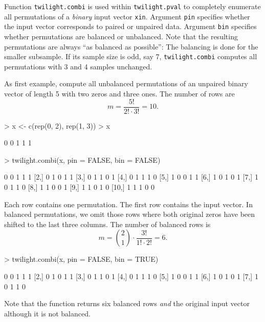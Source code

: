\documentclass[11pt,a4paper,fleqn]{report}
\newcommand{\Rfunction}[1]{{\texttt{#1}}}
\newcommand{\Rfunarg}[1]{{\texttt{#1}}}
\begin{document}
Function \Rfunction{twilight.combi} is used within \Rfunction{twilight.pval} to completely enumerate all permutations of a \textit{binary} input vector \Rfunarg{xin}. Argument \Rfunarg{pin} specifies whether the input vector corresponds to paired or unpaired data. Argument \Rfunarg{bin} specifies whether permutations are balanced or unbalanced. Note that the resulting permutations are always ``as balanced as possible'': The balancing is done for the smaller subsample. If its sample size is odd, say 7, \Rfunction{twilight.combi} computes all permutations with 3 and 4 samples unchanged.

As first example, compute all unbalanced permutations of an unpaired binary vector of length 5 with two zeros and three ones. The number of rows are 
\begin{equation}
m = \frac{5!}{2! \cdot 3!} = 10.
\end{equation}
\begin{Schunk}
\begin{Sinput}
> x <- c(rep(0, 2), rep(1, 3))
> x
\end{Sinput}
\begin{Soutput}
[1] 0 0 1 1 1
\end{Soutput}
\end{Schunk}

\begin{Schunk}
\begin{Sinput}
> twilight.combi(x, pin = FALSE, bin = FALSE)
\end{Sinput}
\begin{Soutput}
      [,1] [,2] [,3] [,4] [,5]
 [1,]    0    0    1    1    1
 [2,]    0    1    0    1    1
 [3,]    0    1    1    0    1
 [4,]    0    1    1    1    0
 [5,]    1    0    0    1    1
 [6,]    1    0    1    0    1
 [7,]    1    0    1    1    0
 [8,]    1    1    0    0    1
 [9,]    1    1    0    1    0
[10,]    1    1    1    0    0
\end{Soutput}
\end{Schunk}

Each row contains one permutation. The first row contains the input vector. In balanced permutations, we omit those rows where both original zeros have been shifted to the last three columns. The number of balanced rows is
\begin{equation}
m = {2 \choose 1} \cdot \frac{3!}{1! \cdot 2!} = 6.
\end{equation}
\begin{Schunk}
\begin{Sinput}
> twilight.combi(x, pin = FALSE, bin = TRUE)
\end{Sinput}
\begin{Soutput}
     [,1] [,2] [,3] [,4] [,5]
[1,]    0    0    1    1    1
[2,]    0    1    0    1    1
[3,]    0    1    1    0    1
[4,]    0    1    1    1    0
[5,]    1    0    0    1    1
[6,]    1    0    1    0    1
[7,]    1    0    1    1    0
\end{Soutput}
\end{Schunk}
Note that the function returns six balanced rows \textit{and} the original input vector although it is not balanced.
       
\end{document}
